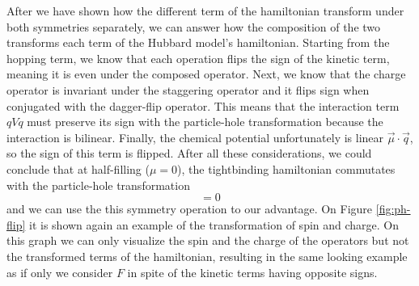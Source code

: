 After we have shown how the different term of the hamiltonian transform under both symmetries separately, we can answer how the composition of the two transforms each term of the Hubbard model's hamiltonian. Starting from the hopping term, we know that each operation flips the sign of the kinetic term, meaning it is even under the composed operator. Next, we know that the charge operator is invariant under the staggering operator and it flips sign when conjugated with the dagger-flip operator. This means that the interaction term $qVq$ must preserve its sign with the particle-hole transformation because the interaction is bilinear. Finally, the chemical potential unfortunately is linear $\vec{\mu}\cdot \vec{q}$, so the sign of this term is flipped. After all these considerations, we could conclude that at half-filling ($\mu = 0$), the tightbinding hamiltonian commutates with the particle-hole transformation
\begin{equation}
  [H, XF] = 0
\end{equation} 
and we can use the this symmetry operation to our advantage. On Figure \ref{fig:ph-flip} it is shown again an example of the transformation of spin and charge. On this graph we can only visualize the spin and the charge of the operators but not the transformed terms of the hamiltonian, resulting in the same looking example as if only we consider $F$ in spite of the kinetic terms having opposite signs.
